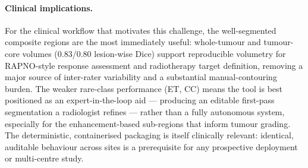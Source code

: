 \documentclass[11pt,a4paper]{article}
\begin{document}
\paragraph{Clinical implications.}
For the clinical workflow that motivates this challenge, the well-segmented composite
regions are the most immediately useful: whole-tumour and tumour-core volumes
($0.83$/$0.80$ lesion-wise Dice) support reproducible volumetry for RAPNO-style
response assessment and radiotherapy target definition, removing a major source of
inter-rater variability and a substantial manual-contouring burden. The weaker
rare-class performance (ET, CC) means the tool is best positioned as an
expert-in-the-loop aid --- producing an editable first-pass segmentation a
radiologist refines --- rather than a fully autonomous system, especially for the
enhancement-based sub-regions that inform tumour grading. The deterministic,
containerised packaging is itself clinically relevant: identical, auditable behaviour
across sites is a prerequisite for any prospective deployment or multi-centre study.

\end{document}
